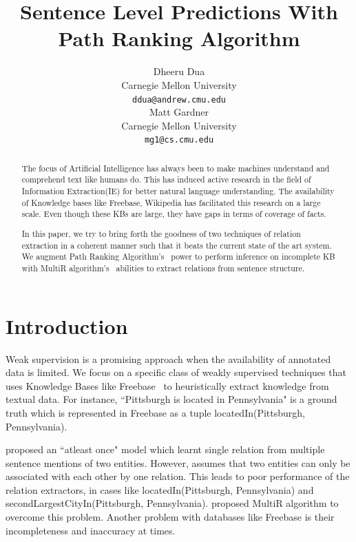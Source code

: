 \documentclass[11pt,a4paper]{article}
\title{Sentence Level Predictions With Path Ranking Algorithm}
\author{Dheeru Dua \\
  Carnegie Mellon University \\
  {\tt ddua@andrew.cmu.edu} \\\And
  Matt Gardner \\
  Carnegie Mellon University \\
  {\tt mg1@cs.cmu.edu} \\}
\date{}
\begin{document}
\maketitle
\begin{abstract}

The focus of Artificial Intelligence has always been to make machines
understand and comprehend text like humans do. This has induced active research
in the field of Information Extraction(IE) for better natural language
understanding. The availability of Knowledge bases like Freebase, Wikipedia has
facilitated this research on a large scale. Even though these KBs are large,
they have gaps in terms of coverage of facts.

In this paper, we try to bring forth the goodness of two techniques of relation
extraction in a coherent manner such that it beats the current state of the art
system. We augment Path Ranking Algorithm's~\cite{lao-2010-pra} power to
perform inference on incomplete KB with MultiR
algorithm's~\cite{hoffmann-2011-distant-supervision} abilities to extract
relations from sentence structure.

\end{abstract}

\section{Introduction}

Weak supervision is a promising approach when the availability of annotated
data is limited. We focus on a specific class of weakly supervised techniques
that uses Knowledge Bases like Freebase~\cite{freebase-2008-bollacker} to
heuristically extract knowledge from textual data. For instance, ``Pittsburgh
is located in Pennsylvania" is a ground truth which is represented in Freebase
as a tuple locatedIn(Pittsburgh, Pennsylvania).

\cite{riedel-2010-distant-supervision} proposed an ``atleast once" model which
learnt single relation from multiple sentence mentions of two entities.
However, \cite{riedel-2010-distant-supervision} assumes that two entities can
only be associated with each other by one relation. This leads to poor
performance of the relation extractors, in cases like locatedIn(Pittsburgh,
Pennsylvania) and secondLargestCityIn(Pittsburgh, Pennsylvania).
\cite{hoffmann-2011-distant-supervision} proposed MultiR algorithm to overcome
this problem.  Another problem with databases like Freebase is their
incompleteness and inaccuracy at times.
\end{document}
